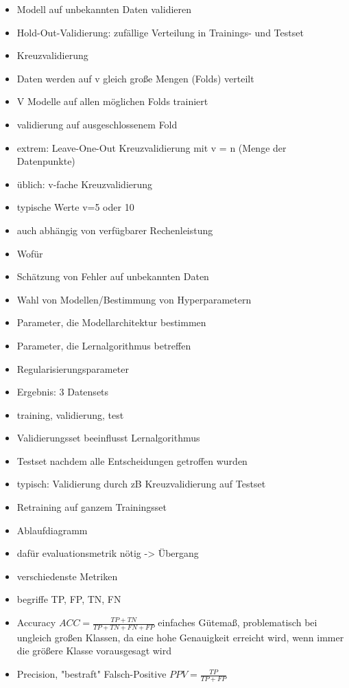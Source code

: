 	\begin{itemize}
		\item Modell auf unbekannten Daten validieren
		\item Hold-Out-Validierung: zufällige Verteilung in Trainings- und Testset
		\item Kreuzvalidierung
		\item Daten werden auf v gleich große Mengen (Folds) verteilt
		\item V Modelle auf allen möglichen Folds trainiert
		\item validierung auf ausgeschlossenem Fold
		\item extrem: Leave-One-Out Kreuzvalidierung mit v = n (Menge der Datenpunkte)
		\item üblich: v-fache Kreuzvalidierung
		\item typische Werte v=5 oder 10
		\item auch abhängig von verfügbarer Rechenleistung
		\item Wofür
		\item Schätzung von Fehler auf unbekannten Daten
		\item Wahl von Modellen/Bestimmung von Hyperparametern
		\item Parameter, die Modellarchitektur bestimmen
		\item Parameter, die Lernalgorithmus betreffen
		\item Regularisierungsparameter
		\item Ergebnis: 3 Datensets
		\item training, validierung, test
		\item Validierungsset beeinflusst Lernalgorithmus
		\item Testset nachdem alle Entscheidungen getroffen wurden
		\item typisch: Validierung durch zB Kreuzvalidierung auf Testset
		\item Retraining auf ganzem Trainingsset
		\item Ablaufdiagramm
		\item dafür evaluationsmetrik nötig -> Übergang
		\item verschiedenste Metriken
		\item begriffe TP, FP, TN, FN
		\item Accuracy $ACC = \frac{TP + TN}{TP + TN + FN + FP}$ einfaches Gütemaß, problematisch bei ungleich großen Klassen, da eine hohe Genauigkeit erreicht wird, wenn immer die größere Klasse vorausgesagt wird
		\item Precision, "bestraft" Falsch-Positive $PPV = \frac{TP}{TP + FP}$

\end{itemize}
